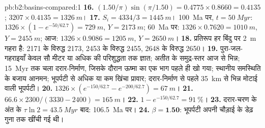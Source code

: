 \begin{solution}{pb:b2:basins-compared:1}
\textbf{16.} $(1.50/\pi)\sin(\pi/1.50) = 0.4775\times0.8660 = 0.4135$; $3207\times0.4135 =
\qty{1326}{m}$।
\textbf{17.} $S_i = 4334/3 = \qty{1445}{m}$। \qty{100}{Ma} पर, $t = \qty{50}{Myr}$: $1326\times(1 -
e^{-50/62.7}) = \qty{729}{m}$, $Y = \qty{2173}{m}$; \qty{60}{Ma} पर: $1326\times0.7620 =
\qty{1010}{m}$, $Y = \qty{2455}{m}$; आज: $1326\times0.9086 = \qty{1205}{m}$, $Y = \qty{2650}{m}$।
\textbf{18.} प्रतिरूप हर बिंदु पर \qty{2}{m} गहरा है: 2171 के विरुद्ध 2173, 2453 के विरुद्ध 2455,
2648 के विरुद्ध 2650।
\textbf{19.} पुरा-जल-गहराइयाँ केवल सौ मीटर या अधिक की परिशुद्धता तक ज्ञात; अतीत के समुद्र-स्तर
आज से भिन्न; \qty{15}{Myr} तक चला दरार-निर्माण, जिसके दौरान ऊष्मा का एक भाग
पहले ही खो गया; स्थानीय समस्थिति के बजाय आनमन; भूपर्पटी से अधिक या कम खिंचा प्रावार;
दरार-निर्माण से पहले \qty{35}{km} से भिन्न मोटाई वाली भूपर्पटी।
\textbf{20.} $1326\times(e^{-150/62.7} - e^{-200/62.7}) = \qty{67}{m}$।
\textbf{21.} $66.6\times2300/(3330 - 2400) = \qty{165}{m}$।
\textbf{22.} $1 - e^{-150/62.7} = \qty{91}{\percent}$।
\textbf{23.} दरार-चरण के अंत के $\tau\ln2 = \qty{43.5}{Myr}$ बाद: \qty{106.5}{Ma} पर।
\textbf{24.} $\beta = \textbf{1.50}$: भूपर्पटी अपनी चौड़ाई के डेढ़ गुना तक खींची गई थी।
\end{solution}
